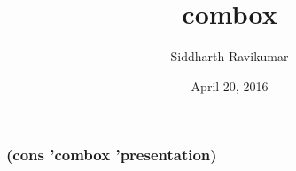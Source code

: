 \documentclass[17pt]{beamer}
\title{combox}
\author{Siddharth Ravikumar}
\institute{0x00B252AF}
\date{April 20, 2016}
\begin{document}
\begin{frame}
  \titlepage
\end{frame}

\begin{frame}
  \frametitle{(cons 'combox 'presentation)}
  \tableofcontents
\end{frame}














\end{document}

